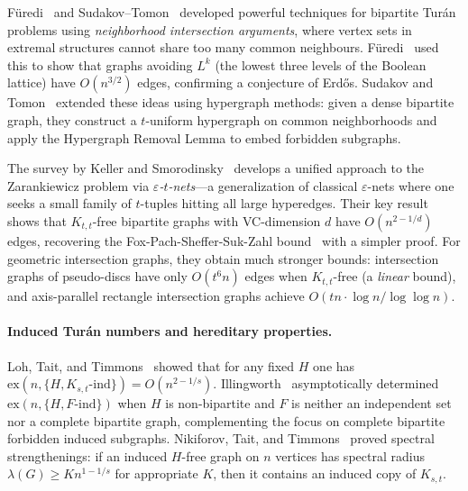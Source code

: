 \documentclass{article}
\theoremstyle{definition}
\theoremstyle{definition}
\theoremstyle{definition}
\theoremstyle{definition}
\theoremstyle{definition}
\theoremstyle{definition}
\theoremstyle{definition}
\theoremstyle{definition}
\theoremstyle{definition}
\theoremstyle{definition}
\begin{document}
F\"uredi~\cite{Furedi1991} and Sudakov--Tomon~\cite{Sudakov2020} developed powerful techniques for bipartite Tur\'an problems using \emph{neighborhood intersection arguments}, where vertex sets in extremal structures cannot share too many common neighbours.
F\"uredi~\cite{Furedi1991} used this to show that graphs avoiding $L^k$ (the lowest three levels of the Boolean lattice) have $O(n^{3/2})$ edges, confirming a conjecture of Erd\H{o}s.
Sudakov and Tomon~\cite{Sudakov2020} extended these ideas using hypergraph methods: given a dense bipartite graph, they construct a $t$-uniform hypergraph on common neighborhoods and apply the Hypergraph Removal Lemma to embed forbidden subgraphs.

The survey by Keller and Smorodinsky~\cite{Smorodinsky2023} develops a unified approach to the Zarankiewicz problem via \emph{$\varepsilon$-$t$-nets}---a generalization of classical $\varepsilon$-nets where one seeks a small family of $t$-tuples hitting all large hyperedges.
Their key result shows that $K_{t,t}$-free bipartite graphs with VC-dimension $d$ have $O(n^{2-1/d})$ edges, recovering the Fox-Pach-Sheffer-Suk-Zahl bound~\cite{Smorodinsky2023} with a simpler proof.
For geometric intersection graphs, they obtain much stronger bounds: intersection graphs of pseudo-discs have only $O(t^6 n)$ edges when $K_{t,t}$-free (a \emph{linear} bound), and axis-parallel rectangle intersection graphs achieve $O(tn \cdot \log n / \log\log n)$.

\paragraph{Induced Tur\'an numbers and hereditary properties.}
Loh, Tait, and Timmons~\cite{Loh2016} showed that for any fixed $H$ one has $\text{ex}(n, \{H, K_{s,t}\text{-ind}\}) = O(n^{2-1/s})$.
Illingworth~\cite{Illingworth2021} asymptotically determined $\text{ex}(n, \{H, F\text{-ind}\})$ when $H$ is non-bipartite and $F$ is neither an independent set nor a complete bipartite graph, complementing the focus on complete bipartite forbidden induced subgraphs.
Nikiforov, Tait, and Timmons~\cite{Nikiforov2021} proved spectral strengthenings: if an induced $H$-free graph on $n$ vertices has spectral radius $\lambda(G) \geq Kn^{1-1/s}$ for appropriate $K$, then it contains an induced copy of $K_{s,t}$.
\end{document}
